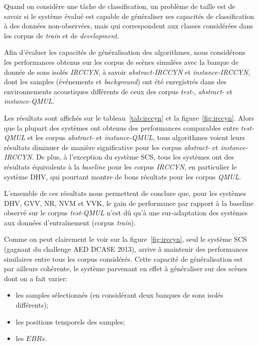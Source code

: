 Quand on considère une tâche de classification, un problème de taille est de savoir si le système évalué est capable de généraliser ses capacités de classification à des données non-observées, mais qui correspondent aux classes considérées dans les corpus de \emph{train} et de \emph{development}.

Afin d'évaluer les capacités de généralisation des algorithmes, nous considérons les performances obtenus sur les corpus de scènes simulées avec la banque de donnée de sons isolés \emph{IRCCYN}, à savoir \emph{abstract-IRCCYN} et \emph{instance-IRCCYN}, dont les samples (événements et \emph{background}) ont été enregistrés dans des environnements acoustiques différents de ceux des corpus \emph{test-},  \emph{abstract-} et \emph{instance-QMUL}.

Les résultats sont affichés sur le tableau~\ref{tab:irccyn} et la figure~\ref{fig:irccyn}. Alors que la plupart des systèmes ont obtenus des performances comparables entre \emph{test-QMUL} et les corpus \emph{abstract-} et \emph{instance-QMUL}, tous algorithmes voient leurs résultats diminuer de manière significative pour les corpus  \emph{abstract-} et \emph{instance-IRCCYN}. De plus, à l'exception du système SCS, tous les systèmes ont des résultats équivalents à la \emph{baseline} pour les corpus \emph{IRCCYN}, en particulier le système DHV, qui pourtant montre de bons résultats pour les corpus \emph{QMUL}.

L'ensemble de ces résultats nous permettent de conclure que, pour les systèmes DHV, GVV, NR, NVM et VVK, le gain de performance par rapport à la baseline observé sur le corpus \emph{test-QMUL} n'est dû qu'à une sur-adaptation des systèmes aux données d'entraînement (corpus \emph{train}). 

Comme on peut clairement le voir sur la figure~\ref{fig:irccyn}, seul le système SCS (gagnant du challenge AED DCASE 2013), arrive à maintenir des performances similaires entre tous les corpus considérés. Cette capacité de généralisation est par ailleurs cohérente, le système parvenant en effet à généraliser sur des scènes dont on a fait varier: 

\begin{itemize}
\item les samples sélectionnés (en considérant deux banques de sons isolés différents);
\item les positions temporels des samples;
\item les $EBRs$.
\end{itemize}

